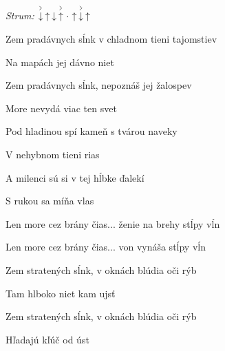 \begin{song}


\begin{headerbox}
\RaiseBoxWithAccents
\textit{Strum:} $\AccentDown\Up\Down\AccentUp\Miss\Up\AccentDown\Up$
\end{headerbox}

\begin{chordbox}
\end{chordbox}

\large

\bigskip


Zem pradávnych sĺnk v chladnom tieni tajomstiev \par
Na mapách jej dávno niet \par
Zem pradávnych sĺnk, nepoznáš jej žalospev \par
More nevydá viac ten svet \par

\bigskip

Pod hladinou spí kameň s tvárou naveky \par
{}V nehybnom tieni rias \par
A milenci sú si v tej hĺbke ďalekí \par
{}S rukou sa míňa vlas \par

\bigskip

Len more cez brány čias... ženie na brehy stĺpy vĺn \par
Len more cez brány čias... von vynáša stĺpy vĺn \par

\bigskip

 \par

\bigskip

Zem stratených sĺnk, v oknách blúdia oči rýb \par
Tam hlboko niet kam ujsť \par
Zem stratených sĺnk, v oknách blúdia oči rýb \par
{}Hľadajú kľúč od úst \par


\end{song}
